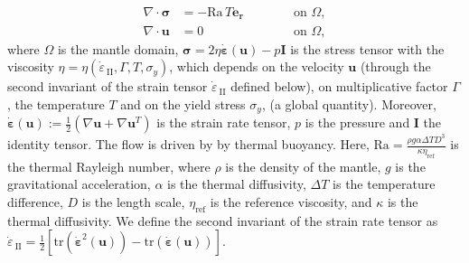 \documentclass[12pt]{article}
\newcommand{\mgnote}[1]{\textcolor{magenta}{MG: #1}}
\newcommand{\gsnote}[1]{\textcolor{blue}{GS: #1}}
\newcommand{\vrnote}[1]{\textcolor{red}{VR: #1}}
\newcommand{\IIinv}{{\dot\varepsilon}_{\mathrm{\!\!\:II}}}
\newcommand{\uu}{{\ensuremath{\boldsymbol{u}}}}
\newcommand{\ssigma}{{\ensuremath{\boldsymbol{\sigma}}}}
\newcommand{\strain}{{\ensuremath{\dot{\boldsymbol{\varepsilon}}}}}
\begin{document}
\begin{subequations}    \label{eq:stokes}
  \label{eq:forward_model}
  \begin{alignat}{2}
    \label{eq:stokes1}
    \nabla \cdot \ssigma &= -\text{Ra}
    \,T\textbf{e}_\textbf{r} \qquad &&\text{ on }\Omega, \\
    \label{eq:incompress}
    \nabla \cdot \uu &= 0 \qquad &&\text{ on } \Omega,
  \end{alignat}
\end{subequations} 
where $\Omega$ is the mantle domain,
$\ssigma = 2\eta\strain(\uu) - p\textbf{I}$ is the stress tensor
 with the viscosity $\eta=\eta(\IIinv, \Gamma, T,
\sigma_y)$, which depends on the velocity $\uu$ (through the
second invariant of the strain tensor $\IIinv$ defined below), on
multiplicative factor $\Gamma$,
the temperature $T$ and on
the yield stress $\sigma_y$, (a global quantity). Moreover,
$\strain(\uu):=\frac{1}{2} (\nabla \uu + \nabla
\uu^T)$ is the strain rate tensor, $p$ is the pressure and
\textbf{I} the identity tensor. The flow is driven by
by thermal buoyancy. Here,
$\text{Ra}=\frac{\rho g \alpha \Delta T D^3}{\kappa
  \eta_{\text{ref}}}$ is the thermal Rayleigh number,
where $\rho$ is the density of the mantle, $g$ is the
gravitational acceleration, $\alpha$ is the thermal
diffusivity, $\Delta T$ is the temperature difference, $D$ is the length scale,
$\eta_{\text{ref}}$ is the reference viscosity, and $\kappa$ is the
thermal diffusivity.
We define the second invariant of the strain rate tensor 
as $\IIinv  = \frac{1}{2}[\text{tr}(\strain^2 (\uu)) -\text{tr}(\strain(\uu))]$. 
\end{document}

